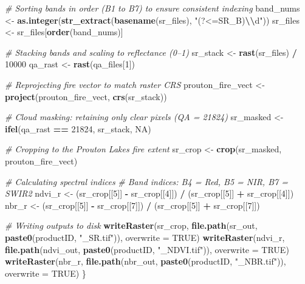 \documentclass[
]{article}
\newenvironment{Shaded}{\begin{snugshade}}{\end{snugshade}}
\newcommand{\AttributeTok}[1]{\textcolor[rgb]{0.13,0.29,0.53}{#1}}
\newcommand{\CommentTok}[1]{\textcolor[rgb]{0.56,0.35,0.01}{\textit{#1}}}
\newcommand{\ConstantTok}[1]{\textcolor[rgb]{0.56,0.35,0.01}{#1}}
\newcommand{\DecValTok}[1]{\textcolor[rgb]{0.00,0.00,0.81}{#1}}
\newcommand{\FunctionTok}[1]{\textcolor[rgb]{0.13,0.29,0.53}{\textbf{#1}}}
\newcommand{\NormalTok}[1]{#1}
\newcommand{\OtherTok}[1]{\textcolor[rgb]{0.56,0.35,0.01}{#1}}
\newcommand{\SpecialCharTok}[1]{\textcolor[rgb]{0.81,0.36,0.00}{\textbf{#1}}}
\newcommand{\StringTok}[1]{\textcolor[rgb]{0.31,0.60,0.02}{#1}}
\begin{document}
\begin{Shaded}
\begin{Highlighting}[]
  \CommentTok{\# Sorting bands in order (B1 to B7) to ensure consistent indexing}
\NormalTok{  band\_nums }\OtherTok{\textless{}{-}} \FunctionTok{as.integer}\NormalTok{(}\FunctionTok{str\_extract}\NormalTok{(}\FunctionTok{basename}\NormalTok{(sr\_files), }\StringTok{"(?\textless{}=SR\_B)}\SpecialCharTok{\textbackslash{}\textbackslash{}}\StringTok{d"}\NormalTok{))}
\NormalTok{  sr\_files  }\OtherTok{\textless{}{-}}\NormalTok{ sr\_files[}\FunctionTok{order}\NormalTok{(band\_nums)]}

  \CommentTok{\# Stacking bands and scaling to reflectance (0–1)}
\NormalTok{  sr\_stack }\OtherTok{\textless{}{-}} \FunctionTok{rast}\NormalTok{(sr\_files) }\SpecialCharTok{/} \DecValTok{10000}
\NormalTok{  qa\_rast  }\OtherTok{\textless{}{-}} \FunctionTok{rast}\NormalTok{(qa\_files[}\DecValTok{1}\NormalTok{])}

  \CommentTok{\# Reprojecting fire vector to match raster CRS}
\NormalTok{  prouton\_fire\_vect }\OtherTok{\textless{}{-}} \FunctionTok{project}\NormalTok{(prouton\_fire\_vect, }\FunctionTok{crs}\NormalTok{(sr\_stack))}

  \CommentTok{\# Cloud masking: retaining only clear pixels (QA = 21824)}
\NormalTok{  sr\_masked }\OtherTok{\textless{}{-}} \FunctionTok{ifel}\NormalTok{(qa\_rast }\SpecialCharTok{==} \DecValTok{21824}\NormalTok{, sr\_stack, }\ConstantTok{NA}\NormalTok{)}

  \CommentTok{\# Cropping to the Prouton Lakes fire extent}
\NormalTok{  sr\_crop }\OtherTok{\textless{}{-}} \FunctionTok{crop}\NormalTok{(sr\_masked, prouton\_fire\_vect)}

  \CommentTok{\# Calculating spectral indices}
  \CommentTok{\# Band indices: B4 = Red, B5 = NIR, B7 = SWIR2}
\NormalTok{  ndvi\_r }\OtherTok{\textless{}{-}}\NormalTok{ (sr\_crop[[}\DecValTok{5}\NormalTok{]] }\SpecialCharTok{{-}}\NormalTok{ sr\_crop[[}\DecValTok{4}\NormalTok{]]) }\SpecialCharTok{/}\NormalTok{ (sr\_crop[[}\DecValTok{5}\NormalTok{]] }\SpecialCharTok{+}\NormalTok{ sr\_crop[[}\DecValTok{4}\NormalTok{]])}
\NormalTok{  nbr\_r  }\OtherTok{\textless{}{-}}\NormalTok{ (sr\_crop[[}\DecValTok{5}\NormalTok{]] }\SpecialCharTok{{-}}\NormalTok{ sr\_crop[[}\DecValTok{7}\NormalTok{]]) }\SpecialCharTok{/}\NormalTok{ (sr\_crop[[}\DecValTok{5}\NormalTok{]] }\SpecialCharTok{+}\NormalTok{ sr\_crop[[}\DecValTok{7}\NormalTok{]])}

  \CommentTok{\# Writing outputs to disk}
  \FunctionTok{writeRaster}\NormalTok{(sr\_crop, }\FunctionTok{file.path}\NormalTok{(sr\_out,   }\FunctionTok{paste0}\NormalTok{(productID, }\StringTok{"\_SR.tif"}\NormalTok{)),   }\AttributeTok{overwrite =} \ConstantTok{TRUE}\NormalTok{)}
  \FunctionTok{writeRaster}\NormalTok{(ndvi\_r,  }\FunctionTok{file.path}\NormalTok{(ndvi\_out, }\FunctionTok{paste0}\NormalTok{(productID, }\StringTok{"\_NDVI.tif"}\NormalTok{)), }\AttributeTok{overwrite =} \ConstantTok{TRUE}\NormalTok{)}
  \FunctionTok{writeRaster}\NormalTok{(nbr\_r,   }\FunctionTok{file.path}\NormalTok{(nbr\_out,  }\FunctionTok{paste0}\NormalTok{(productID, }\StringTok{"\_NBR.tif"}\NormalTok{)),  }\AttributeTok{overwrite =} \ConstantTok{TRUE}\NormalTok{)}
\NormalTok{\}}
\end{Highlighting}
\end{Shaded}
\end{document}
